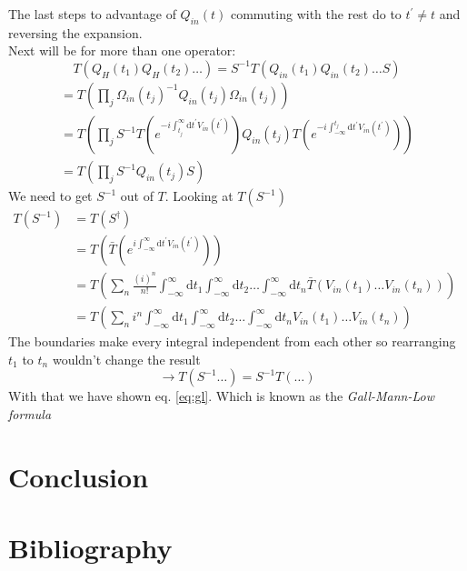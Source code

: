 \documentclass[12pt, titlepage]{article}
\begin{document}
The last steps to advantage of $ Q_{in}(t) $ commuting with the rest do to $ t^{\prime}\neq t $ and reversing the expansion.\\
Next will be for more than one operator:
\begin{equation}\label{eq:gl}
T\left( 
Q_{H}(t_1)
Q_{H}(t_2)
\ldots
\right) 
=
S^{-1}
T\left( 
Q_{in}(t_1)
Q_{in}(t_2)
\ldots
S
\right) 
\end{equation}
\begin{subequations}
\begin{flalign}
&=
T\left( 
\prod_{j}
\Omega_{in}(t_{j})^{-1}
Q_{in}(t_j)
\Omega_{in}(t_{j})
\right) 
&\\
&=
T\left( 
\prod_{j}
S^{-1}
T\left( 
 e^{-i\int_{t_{j}}^{\infty}\mathrm{d}t^{\prime} V_{in}(t^{\prime})}
\right) 
%
Q_{in}(t_{j})
%
T
\left( 
 e^{-i\int_{-\infty}^{t_{j}}\mathrm{d}t^{\prime} V_{in}(t^{\prime})}
\right) 
\right) 
&\\
&=
T\left( 
\prod_{j}
S^{-1}
Q_{in}(t_{j})
S
\right) 
\end{flalign}
\end{subequations}
We need to get $ S^{-1} $ out of $ T $. Looking at $ T(S^{-1}) $ 
\begin{subequations}
\begin{flalign}
 T({S^{-1}})
 &= T(S^{\dagger})
 &\\
&=
T\left( 
\bar{T}
\left( 
 e^{i\int_{-\infty}^{\infty}\mathrm{d}t^{\prime} V_{in}(t^{\prime})}
\right) 
\right) 
 &\\
 &=
 T\left( 
 \sum_{n}
 \frac{(i)^{n}}{n!}
 \int_{-\infty}^{\infty}\mathrm{d}t_{1}
 \int_{-\infty}^{\infty}\mathrm{d}t_{2}
 \ldots
 \int_{-\infty}^{\infty}\mathrm{d}t_{n}
 \bar{T}
 \left( 
  V_{in}(t_{1})
  \ldots
   V_{in}(t_{n})
 \right) 
  \right) 
   &\\
 &=
 T\left( 
 \sum_{n}
 i^{n}
 \int_{-\infty}^{\infty}\mathrm{d}t_{1}
 \int_{-\infty}^{\infty}\mathrm{d}t_{2}
 \ldots
 \int_{-\infty}^{\infty}\mathrm{d}t_{n}
  V_{in}(t_{1})
  \ldots
   V_{in}(t_{n})
  \right) 
\end{flalign}
\end{subequations}
The boundaries make every integral independent from each other so rearranging $ t_{1} $  to $ t_n $ wouldn't change the result 
\[
\rightarrow T(S^{-1} \ldots)=S^{-1} T(\ldots)
\]
With that we have shown eq. \eqref{eq:gl}. Which is known as the \textit{Gall-Mann-Low formula}
\section{Conclusion}
\section{Bibliography}
\end{document}
